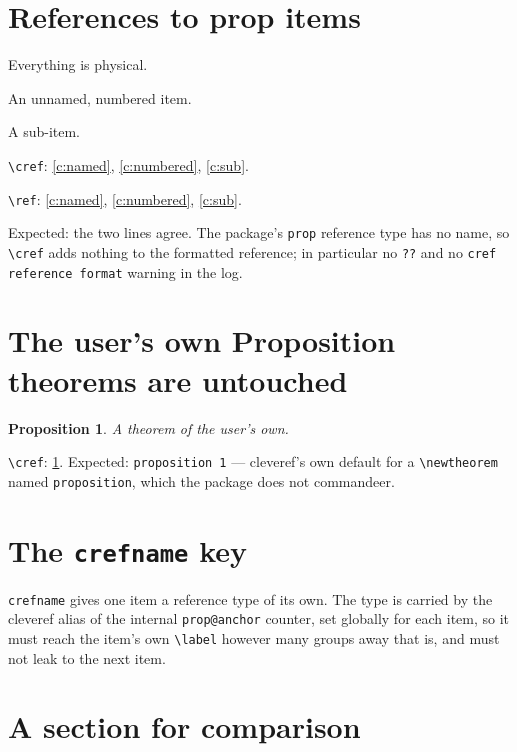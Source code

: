 \documentclass{article}
\newtheorem{proposition}{Proposition}
\begin{document}
\section{References to prop items}

\begin{prop}
  \item[Physicalism] Everything is physical. \label{c:named}
  \item An unnamed, numbered item. \label{c:numbered}
  \begin{prop}
    \item A sub-item. \label{c:sub}
  \end{prop}
\end{prop}

\verb|\cref|: \cref{c:named}, \cref{c:numbered}, \cref{c:sub}.

\verb|\ref|: \ref{c:named}, \ref{c:numbered}, \ref{c:sub}.

Expected: the two lines agree.  The package's \texttt{prop} reference type has
no name, so \verb|\cref| adds nothing to the formatted reference; in particular
no \texttt{??} and no \texttt{cref reference format} warning in the log.

\section{The user's own Proposition theorems are untouched}

\begin{proposition} \label{c:thm} A theorem of the user's own. \end{proposition}

\verb|\cref|: \cref{c:thm}.  Expected: \texttt{proposition 1} --- cleveref's
own default for a \verb|\newtheorem| named \texttt{proposition}, which the
package does not commandeer.

\section{The \texttt{crefname} key}

\texttt{crefname} gives one item a reference type of its own.  The type is
carried by the cleveref alias of the internal \texttt{prop@anchor} counter, set globally
for each item, so it must reach the item's own \verb|\label| however many groups
away that is, and must not leak to the next item.

\section{A section for comparison} \label{c:sec}
\end{document}
